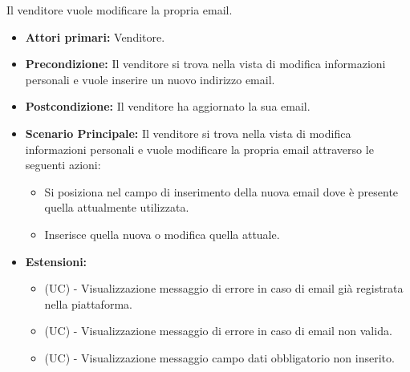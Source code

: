 Il venditore vuole modificare la propria email.
\begin{itemize}
    \item \textbf{Attori primari:} Venditore.
    \item \textbf{Precondizione:} Il venditore si trova nella vista di modifica informazioni personali e vuole inserire un nuovo indirizzo email.
    \item \textbf{Postcondizione:} Il venditore ha aggiornato la sua email.
    \item \textbf{Scenario Principale:} Il venditore si trova nella vista di modifica informazioni personali e vuole modificare la propria email attraverso le seguenti azioni:
        \begin{itemize}
            \item Si posiziona nel campo di inserimento della nuova email dove è presente quella attualmente utilizzata.
            \item Inserisce quella nuova o modifica quella attuale.
        \end{itemize}
    \item \textbf{Estensioni:}
    \begin{itemize}
        \item (UC) - Visualizzazione messaggio di errore in caso di email già registrata nella piattaforma.
        \item (UC) - Visualizzazione messaggio di errore in caso di email non valida.
        \item (UC) - Visualizzazione messaggio campo dati obbligatorio non inserito.
    \end{itemize}
\end{itemize}

